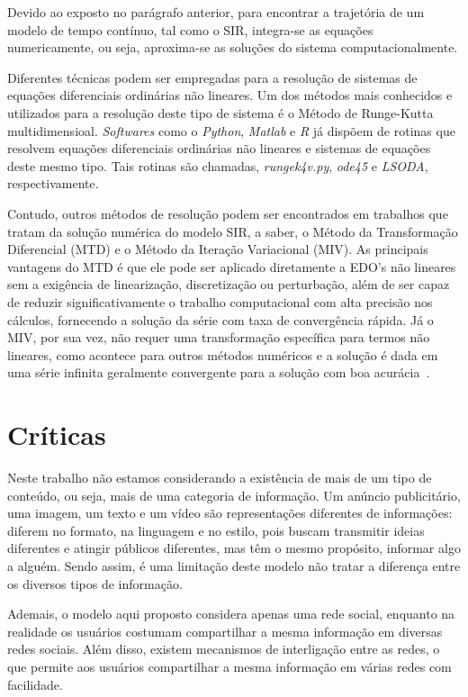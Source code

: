 \documentclass[
	12pt,				%
	openright,			%
	oneside,			%
	a4paper,			%
	english,			%
	french,				%
	spanish,			%
	brazil				%
	]{abntex2}
\begin{document}
Devido ao exposto no parágrafo anterior, para encontrar a trajetória
de um modelo de tempo contínuo, tal como o SIR, integra-se as equações
numericamente, ou seja, aproxima-se as soluções do sistema
computacionalmente.

Diferentes técnicas podem ser empregadas para a resolução de sistemas
de equações diferenciais ordinárias não lineares. Um dos métodos mais
conhecidos e utilizados para a resolução deste tipo de sistema é o
Método de Runge-Kutta multidimensioal. \emph{Softwares} como o
\emph{Python}, \emph{Matlab} e \emph{R} já dispõem de rotinas que
resolvem equações diferenciais ordinárias não lineares e sistemas de
equações deste mesmo tipo. Tais rotinas são chamadas,
\emph{rungek4v.py}, \emph{ode45} e \emph{LSODA}, respectivamente.

Contudo, outros métodos de resolução podem ser encontrados em
trabalhos que tratam da solução numérica do modelo SIR, a saber, o
Método da Transformação Diferencial (MTD) e o Método da Iteração
Variacional (MIV). As principais vantagens do MTD é que ele pode ser
aplicado diretamente a EDO's não lineares sem a exigência de
linearização, discretização ou perturbação, além de ser capaz de
reduzir significativamente o trabalho computacional com alta precisão
nos cálculos, fornecendo a solução da série com taxa de convergência
rápida. Já o MIV, por sua vez, não requer uma transformação específica
para termos não lineares, como acontece para outros métodos numéricos
e a solução é dada em uma série infinita geralmente convergente para a
solução com boa acurácia~\cite{akinboro2014}.


\chapter{Críticas}
Neste trabalho não estamos considerando a existência de mais de um
tipo de conteúdo, ou seja, mais de uma categoria de informação.  Um
anúncio publicitário, uma imagem, um texto e um vídeo são
representações diferentes de informações: diferem no formato, na
linguagem e no estilo, pois buscam transmitir ideias diferentes e
atingir públicos diferentes, mas têm o mesmo propósito, informar algo
a alguém.  Sendo assim, é uma limitação deste modelo não tratar a
diferença entre os diversos tipos de informação.

Ademais, o modelo aqui proposto considera apenas uma rede social,
enquanto na realidade os usuários costumam compartilhar a mesma
informação em diversas redes sociais.  Além disso, existem mecanismos
de interligação entre as redes, o que permite aos usuários
compartilhar a mesma informação em várias redes com facilidade.
\end{document}
